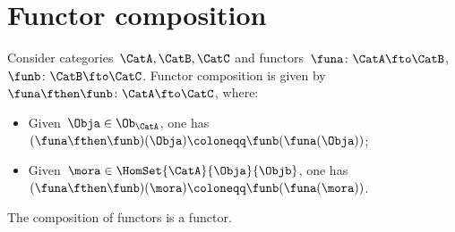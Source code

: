 
\section{Functor composition}

\begin{ctdefinition}
	\label{def:functor_composition}
	Consider categories~$\CatA,\CatB,\CatC$ and functors~$\funa\colon \CatA\fto \CatB$,~$\funb \colon \CatB\fto \CatC$.
	Functor composition is given by~$\funa\fthen \funb\colon \CatA \fto \CatC$, where:
	\begin{itemize}
		\item Given~$\Obja\in \Ob_\CatA$, one has~$(\funa\fthen \funb)(\Obja)\coloneqq\funb(\funa(\Obja))$;
		\item Given~$\mora \in \HomSet{\CatA}{\Obja}{\Objb}$, one has~$(\funa\fthen \funb)(\mora)\coloneqq \funb(\funa(\mora))$.
	\end{itemize}
\end{ctdefinition}

\begin{lemma}
	\label{lem:functors_compose}
	The composition of functors is a functor.
\end{lemma}


